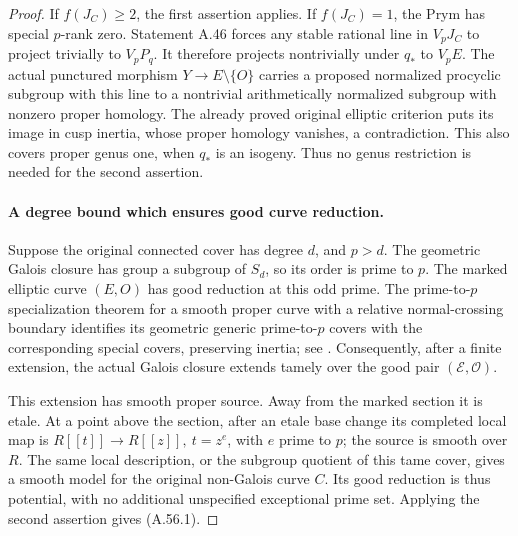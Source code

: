 \begin{proof}
If \(f(J_C)\ge2\), the first assertion applies.
If \(f(J_C)=1\), the Prym has special \(p\)-rank zero.
Statement A.46 forces any stable rational line in
\(V_pJ_C\) to project trivially to \(V_pP_q\).
It therefore projects nontrivially under \(q_*\) to
\(V_pE\). The actual punctured morphism
\(Y\to E\setminus\{O\}\) carries a proposed normalized
procyclic subgroup with this line to a nontrivial
arithmetically normalized subgroup with nonzero proper
homology. The already proved original elliptic criterion
puts its image in cusp inertia, whose proper homology
vanishes, a contradiction. This also covers proper
genus one, when \(q_*\) is an isogeny. Thus no genus
restriction is needed for the second assertion.

\paragraph{A degree bound which ensures good curve reduction.}
Suppose the original connected cover has degree \(d\),
and \(p>d\). The geometric Galois closure has group a
subgroup of \(S_d\), so its order is prime to \(p\).
The marked elliptic curve \((E,O)\) has good reduction
at this odd prime. The prime-to-\(p\) specialization
theorem for a smooth proper curve with a relative
normal-crossing boundary identifies its geometric
generic prime-to-\(p\) covers with the corresponding
special covers, preserving inertia; see
\cite[Expos\'e XIII, Corollary 2.9, Section 2.10,
and the proof of Corollary 2.12, new pp.288--292]{fghSGA1}.
Consequently, after a finite extension, the actual
Galois closure extends tamely over the good pair
\((\mathcal E,\mathcal O)\).

This extension has smooth proper source. Away from the
marked section it is etale. At a point above the section,
after an etale base change its completed local map is
\(R[[t]]\to R[[z]],\ t=z^e\), with \(e\) prime to
\(p\); the source is smooth over \(R\). The same
local description, or the subgroup quotient of this
tame cover, gives a smooth model for the original
non-Galois curve \(C\). Its good reduction is thus
potential, with no additional unspecified exceptional
prime set. Applying the second assertion gives
(A.56.1).
\end{proof}
